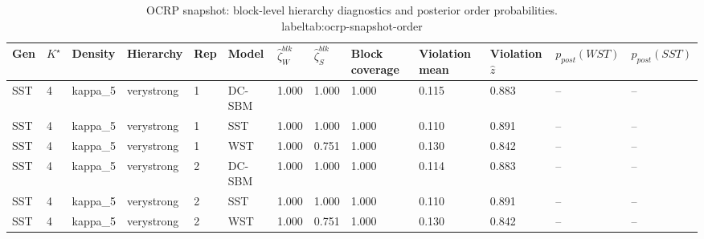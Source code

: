 \begin{table}[!h]
\centering
\caption{OCRP snapshot: block-level hierarchy diagnostics and posterior order probabilities.\\label{tab:ocrp-snapshot-order}}
\centering
\begin{tabular}[t]{lllllllllllll}
\toprule
Gen & $K^\star$ & Density & Hierarchy & Rep & Model & $\widehat\zeta_W^{blk}$ & $\widehat\zeta_S^{blk}$ & Block coverage & Violation mean & Violation $\hat z$ & $p_{post}(WST)$ & $p_{post}(SST)$\\
\midrule
SST & 4 & kappa_5 & verystrong & 1 & DC-SBM & 1.000 & 1.000 & 1.000 & 0.115 & 0.883 & -- & --\\
SST & 4 & kappa_5 & verystrong & 1 & SST & 1.000 & 1.000 & 1.000 & 0.110 & 0.891 & -- & --\\
SST & 4 & kappa_5 & verystrong & 1 & WST & 1.000 & 0.751 & 1.000 & 0.130 & 0.842 & -- & --\\
SST & 4 & kappa_5 & verystrong & 2 & DC-SBM & 1.000 & 1.000 & 1.000 & 0.114 & 0.883 & -- & --\\
SST & 4 & kappa_5 & verystrong & 2 & SST & 1.000 & 1.000 & 1.000 & 0.110 & 0.891 & -- & --\\
SST & 4 & kappa_5 & verystrong & 2 & WST & 1.000 & 0.751 & 1.000 & 0.130 & 0.842 & -- & --\\
\bottomrule
\end{tabular}
\end{table}
